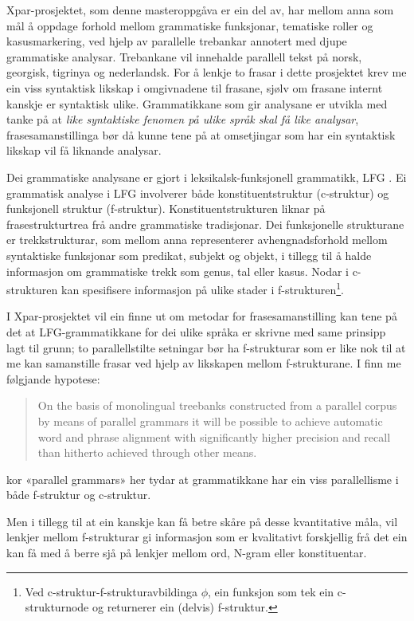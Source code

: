 \documentclass[11pt,a4paper,oneside,draft]{book}
\begin{document}
Xpar-prosjektet, som denne masteroppgåva er ein del av, har mellom
anna som mål å oppdage forhold mellom grammatiske funksjonar,
tematiske roller og kasusmarkering, ved hjelp av parallelle trebankar
annotert med djupe grammatiske analysar. Trebankane vil innehalde
parallell tekst på norsk, georgisk, tigrinya og nederlandsk.  For å
lenkje to frasar i dette prosjektet krev me ein viss syntaktisk
likskap i omgivnadene til frasane, sjølv om frasane internt kanskje er
syntaktisk ulike.  Grammatikkane som gir analysane er utvikla med
tanke på at \emph{like syntaktiske fenomen på ulike språk skal få like analysar}, frasesamanstillinga bør då kunne tene på at omsetjingar som
har ein syntaktisk likskap vil få liknande analysar.

Dei grammatiske analysane er gjort i leksikalsk-funksjonell
grammatikk, LFG \citep{bresnan2001lfs}. Ei grammatisk analyse i LFG
involverer både konstituentstruktur (c-struktur) og funksjonell
struktur (f-struktur). Konstituentstrukturen liknar på
frasestrukturtrea frå andre grammatiske tradisjonar. Dei funksjonelle
strukturane er trekkstrukturar, som mellom anna representerer
avhengnadsforhold mellom syntaktiske funksjonar som predikat, subjekt
og objekt, i tillegg til å halde informasjon om grammatiske trekk som
genus, tal eller kasus. Nodar i c-strukturen kan spesifisere
informasjon på ulike stader i f-strukturen\footnote{Ved c-struktur-f-strukturavbildinga $\phi$, ein funksjon som
        tek ein c-strukturnode og returnerer ein (delvis) f-struktur. }.

I Xpar-prosjektet vil ein finne ut om metodar for frasesamanstilling
kan tene på det at LFG-grammatikkane for dei ulike språka er skrivne
med same prinsipp lagt til grunn; to parallellstilte setningar bør ha
f-strukturar som er like nok til at me kan samanstille frasar ved
hjelp av likskapen mellom f-strukturane. I \citet[s.~72]{dyvik2009lmp}
finn me følgjande hypotese:

\begin{quote}
On the basis of monolingual treebanks constructed from a parallel
corpus by means of parallel grammars it will be possible to achieve
automatic word and phrase alignment with significantly higher
precision and recall than hitherto achieved through other means.
\end{quote}

kor «parallel grammars» her tydar at grammatikkane har ein viss
parallellisme i både f-struktur og c-struktur.

Men i tillegg til at ein kanskje kan få betre skåre på desse
kvantitative måla, vil lenkjer mellom f-strukturar gi informasjon som
er kvalitativt forskjellig frå det ein kan få med å berre sjå på
lenkjer mellom ord, N-gram eller konstituentar.
\end{document}
